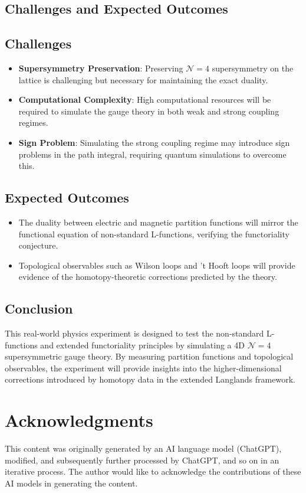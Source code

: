 \documentclass{article}
\theoremstyle{remark}
\begin{document}
\subsection{Challenges and Expected Outcomes}
\subsection{Challenges}
\begin{itemize}
    \item \textbf{Supersymmetry Preservation}: Preserving $ \mathcal{N}=4 $ supersymmetry on the lattice is challenging but necessary for maintaining the exact duality.
    \item \textbf{Computational Complexity}: High computational resources will be required to simulate the gauge theory in both weak and strong coupling regimes.
    \item \textbf{Sign Problem}: Simulating the strong coupling regime may introduce sign problems in the path integral, requiring quantum simulations to overcome this.
\end{itemize}

\subsection{Expected Outcomes}
\begin{itemize}
    \item The duality between electric and magnetic partition functions will mirror the functional equation of non-standard L-functions, verifying the functoriality conjecture.
    \item Topological observables such as Wilson loops and 't Hooft loops will provide evidence of the homotopy-theoretic corrections predicted by the theory.
\end{itemize}

\subsection{Conclusion}
This real-world physics experiment is designed to test the non-standard L-functions and extended functoriality principles by simulating a 4D $ \mathcal{N}=4 $ supersymmetric gauge theory. By measuring partition functions and topological observables, the experiment will provide insights into the higher-dimensional corrections introduced by homotopy data in the extended Langlands framework.


\section{Acknowledgments}
This content was originally generated by an AI language model (ChatGPT), modified, and subsequently further processed by ChatGPT, and so on in an iterative process. The author would like to acknowledge the contributions of these AI models in generating the content.
\end{document}
